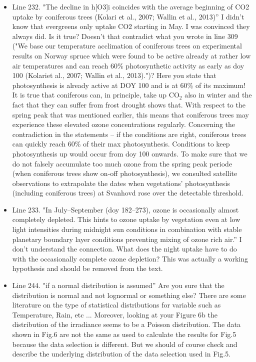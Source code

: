 \documentclass{scrartcl}
\begin{document}
\begin{itemize}
\item {\color{blue}Line 232. "The decline in h[O3]i coincides with the average beginning of CO2 uptake by coniferous trees (Kolari et al., 2007; Wallin et al., 2013)” I didn't know that evergreens only uptake CO2 starting in May. I was convinced they always did. Is it true? Doesn't that contradict what you wrote in line 309 ("We base our temperature acclimation of coniferous trees on experimental results on Norway spruce which were found to be active already at rather low air temperatures and can reach 60\% photosynthetic activity as early as doy 100 (Kolariet al., 2007; Wallin et al., 2013).")? Here you state that photosynthesis is already active at DOY 100 and is at 60\% of its maximum!}
It is true that coniferous can, in principle, take up $\mathrm{CO_2}$ also in winter and the fact that they can suffer from frost drought shows that. With respect to the spring peak that was mentioned earlier, this means that coniferous trees may experience these elevated ozone concentrations regularly. Concerning the contradiction in the statements -- if the conditions are right, coniferous trees can quickly reach 60\% of their max photosynthesis. Conditions to keep photosynthesis up would occur from doy 100 onwards. To make sure that we do not falsely accumulate too much ozone from the spring peak periode (when coniferous trees show on-off photosynthesis), we consulted satellite observations to extrapolate the dates when vegetations' photosynthesis (including coniferous trees) at Svanhovd rose over the detectable threshold.

\item {\color{blue}Line 233. "In July--September (doy 182--273), ozone is occasionally almost completely depleted. This hints to ozone uptake by vegetation even at low light intensities during midnight sun conditions in combination with stable planetary boundary layer conditions preventing mixing of ozone rich air.”
I don't understand the connection. What does the night uptake have to do with the
occasionally complete ozone depletion?} This was actually a working hypothesis and should be removed from the text.

\item {\color{blue}Line 244. "if a normal distribution is assumed” 
Are you sure that the distribution is normal and not lognormal or something else? There are some literature on the type of statistical distributions for variable such as Temperature, Rain, etc ...
Moreover, looking at your Figure 6b the distribution of the irradiance seems to be a
Poisson distribution.}
The data shown in Fig.6 are not the same as used to calculate the results for Fig.5 because the data selection is different. But we should of course check and describe the underlying distribution of the data selection used in Fig.5.


\end{itemize}
\end{document}
